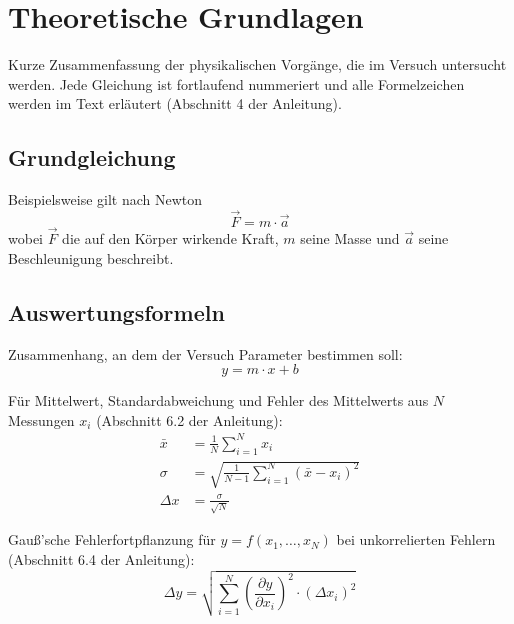 \section{Theoretische Grundlagen}
\label{sec:theorie}

Kurze Zusammenfassung der physikalischen Vorgänge, die im Versuch
untersucht werden. Jede Gleichung ist fortlaufend nummeriert und alle
Formelzeichen werden im Text erläutert (Abschnitt 4 der Anleitung).

\subsection{Grundgleichung}
Beispielsweise gilt nach Newton
\begin{equation}
  \vec{F} = m \cdot \vec{a}
  \label{eq:newton}
\end{equation}
wobei $\vec{F}$ die auf den Körper wirkende Kraft, $m$ seine Masse und
$\vec{a}$ seine Beschleunigung beschreibt.

\subsection{Auswertungsformeln}
Zusammenhang, an dem der Versuch Parameter bestimmen soll:
\begin{equation}
  y = m \cdot x + b
  \label{eq:gerade}
\end{equation}

Für Mittelwert, Standardabweichung und Fehler des Mittelwerts aus
$N$ Messungen $x_i$ (Abschnitt 6.2 der Anleitung):
\begin{align}
  \bar{x} &= \frac{1}{N} \sum_{i=1}^{N} x_i
  \label{eq:mittelwert}\\
  \sigma    &= \sqrt{\frac{1}{N-1} \sum_{i=1}^{N} \left(\bar{x} - x_i\right)^2}
  \label{eq:standardabweichung}\\
  \Delta x &= \frac{\sigma}{\sqrt{N}}
  \label{eq:fehler_mittelwert}
\end{align}

Gauß'sche Fehlerfortpflanzung für $y = f(x_1, \dots, x_N)$ bei
unkorrelierten Fehlern (Abschnitt 6.4 der Anleitung):
\begin{equation}
  \Delta y = \sqrt{\sum_{i=1}^{N}
    \left(\frac{\partial y}{\partial x_i}\right)^2 \cdot \left(\Delta x_i\right)^2}
  \label{eq:fehlerfortpflanzung}
\end{equation}
